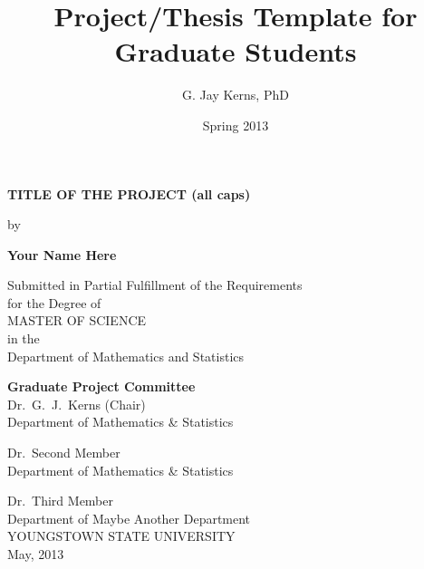 \documentclass[11pt]{article}
\author{G. Jay Kerns, PhD}
\date{Spring 2013}
\title{Project/Thesis Template for Graduate Students}
\renewcommand{\maketitle}{}
\begin{document}
\maketitle

%

\newpage
\thispagestyle{empty}
\begin{center}
\textbf{TITLE OF THE PROJECT (all caps)} 

\vspace{0.25in}
by 
\vspace{0.25in}

\textbf{Your Name Here}

\vspace{1in}

Submitted in Partial Fulfillment of the Requirements\\
for the Degree of\\
\vspace{0.1in}
MASTER OF SCIENCE\\
\vspace{0.1in}
in the\\
Department of Mathematics and Statistics\\

\vspace{1in}

\textbf{Graduate Project Committee}\\
\bigskip
Dr.\ G.\ J.\ Kerns (Chair)\\
Department of Mathematics \& Statistics\\
\bigskip

Dr.\ Second Member\\
Department of Mathematics \& Statistics\\
\bigskip

Dr.\ Third Member \\
Department of Maybe Another Department\\

\vfill
YOUNGSTOWN STATE UNIVERSITY\\
May, 2013 
\end{center}
\end{document}
